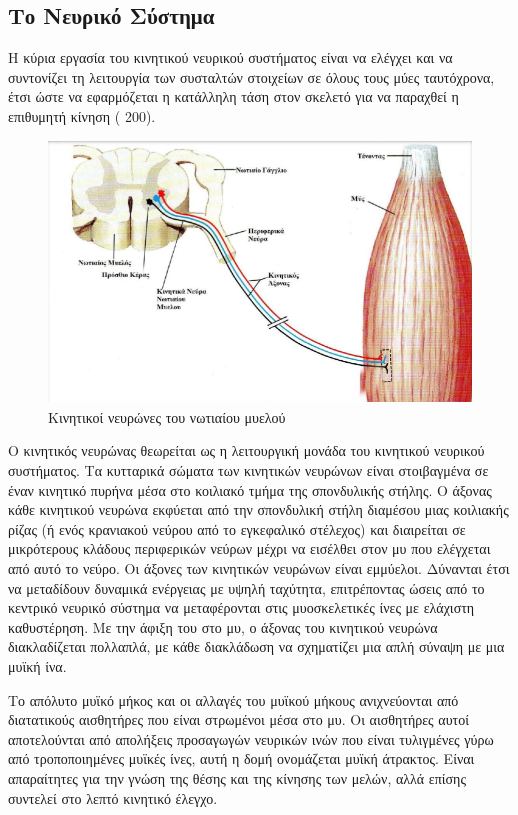 \subsection{Το Νευρικό Σύστημα}

Η κύρια εργασία του κινητικού νευρικού συστήματος είναι να ελέγχει και να συντονίζει τη λειτουργία των συσταλτών στοιχείων σε όλους τους μύες ταυτόχρονα, έτσι ώστε να εφαρμόζεται η κατάλληλη τάση στον σκελετό για να παραχθεί η επιθυμητή κίνηση ( 200).

\begin{figure}[H]
    \centering
    \includegraphics[width=.8\textwidth]{neuromusculoskeletal/fig/muscle-fysiology4.png}
    \caption{Κινητικοί νευρώνες του νωτιαίου μυελού\protect\footnotemark}
    \label{fig:muscle-fysiology4}
\end{figure}

Ο κινητικός νευρώνας θεωρείται ως η λειτουργική μονάδα του κινητικού νευρικού συστήματος. Τα κυτταρικά σώματα των κινητικών νευρώνων είναι στοιβαγμένα σε έναν κινητικό πυρήνα μέσα στο κοιλιακό τμήμα της σπονδυλικής στήλης. Ο άξονας κάθε κινητικού νευρώνα εκφύεται από την σπονδυλική στήλη διαμέσου μιας κοιλιακής ρίζας (ή ενός κρανιακού νεύρου από το εγκεφαλικό στέλεχος) και διαιρείται σε μικρότερους κλάδους περιφερικών νεύρων μέχρι να εισέλθει στον μυ που ελέγχεται από αυτό το νεύρο. Οι άξονες των κινητικών νευρώνων είναι εμμύελοι. Δύνανται έτσι να μεταδίδουν δυναμικά ενέργειας με υψηλή ταχύτητα, επιτρέποντας ώσεις από το κεντρικό νευρικό σύστημα να μεταφέρονται στις μυοσκελετικές ίνες με ελάχιστη καθυστέρηση. Με την άφιξη του στο μυ, ο άξονας του κινητικού νευρώνα διακλαδίζεται πολλαπλά, με κάθε διακλάδωση να σχηματίζει μια απλή σύναψη με μια μυϊκή ίνα.

Το απόλυτο μυϊκό μήκος και οι αλλαγές του μυϊκού μήκους ανιχνεύονται από διατατικούς αισθητήρες που είναι στρωμένοι μέσα στο μυ. Οι αισθητήρες αυτοί αποτελούνται από απολήξεις προσαγωγών νευρικών ινών που είναι τυλιγμένες γύρω από τροποποιημένες μυϊκές ίνες, αυτή η δομή ονομάζεται μυϊκή άτρακτος. Είναι απαραίτητες για την γνώση της θέσης και της κίνησης των μελών, αλλά επίσης συντελεί στο λεπτό κινητικό έλεγχο.

